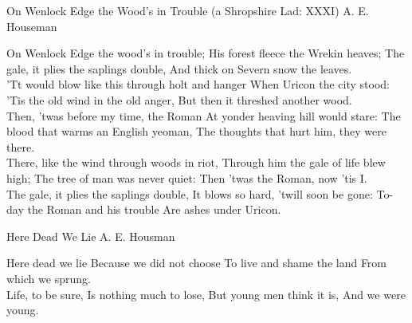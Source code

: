 \begin{poem}
{On Wenlock Edge the Wood's in Trouble (a Shropshire Lad: XXXI)}
{A. E. Houseman}

     On Wenlock Edge the wood's in trouble; 
         His forest fleece the Wrekin heaves;  
     The gale, it plies the saplings double,  
         And thick on Severn snow the leaves.  \\

     'Tt would blow like this through holt and hanger 
         When Uricon the city stood:  
     'Tis the old wind in the old anger,  
         But then it threshed another wood.  \\

     Then, 'twas before my time, the Roman 
       At yonder heaving hill would stare:  
   The blood that warms an English yeoman,  
       The thoughts that hurt him, they were there. \\

   There, like the wind through woods in riot,  
       Through him the gale of life blew high;  
   The tree of man was never quiet:  
       Then 'twas the Roman, now 'tis I.  \\

   The gale, it plies the saplings double,  
       It blows so hard, 'twill soon be gone:  
   To-day the Roman and his trouble 
       Are ashes under Uricon.  
\end{poem}

\begin{poem}
  {Here Dead We Lie}
  {A. E. Housman}

 Here dead we lie 
 Because we did not choose 
 To live and shame the land 
 From which we sprung. \\

 Life, to be sure,  
 Is nothing much to lose, 
 But young men think it is, 
 And we were young. 
\end{poem}




